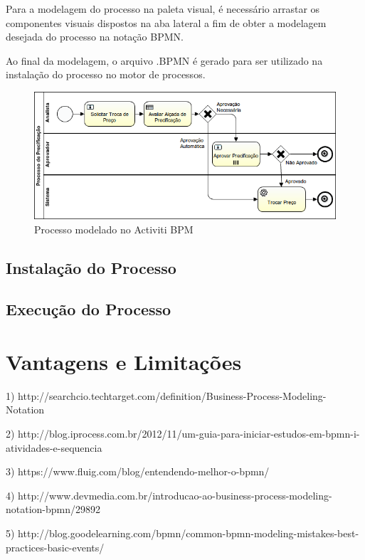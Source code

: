 Para a modelagem do processo na paleta visual, é necessário arrastar os componentes visuais dispostos na aba lateral a fim de obter a modelagem desejada do processo na notação BPMN.

Ao final da modelagem, o arquivo .BPMN é gerado para ser utilizado na instalação do processo no motor de processos.

\begin{figure}[H]
\centering
\includegraphics[width=1.0\textwidth]{imagens/ProcessoDePrecificacao}
\caption{Processo modelado no Activiti BPM}
\label{fig:processo_precificacao}
\end{figure}

\subsection{Instalação do Processo}\label{sec:automatizacao_processos-automatizar_processo_modelagem}

\subsection{Execução do Processo}\label{sec:automatizacao_processos-automatizar_processo_modelagem}

\section{Vantagens e Limitações}\label{sec:automatizacao_processos-vantagens_limitacoes}


1) http://searchcio.techtarget.com/definition/Business-Process-Modeling-Notation

2) http://blog.iprocess.com.br/2012/11/um-guia-para-iniciar-estudos-em-bpmn-i-atividades-e-sequencia

3) https://www.fluig.com/blog/entendendo-melhor-o-bpmn/

4) http://www.devmedia.com.br/introducao-ao-business-process-modeling-notation-bpmn/29892

5) http://blog.goodelearning.com/bpmn/common-bpmn-modeling-mistakes-best-practices-basic-events/